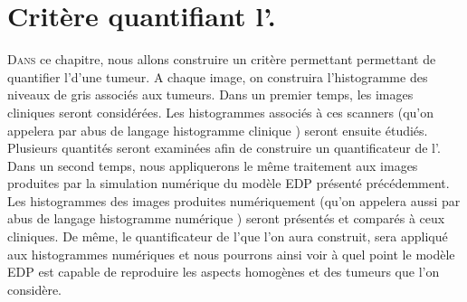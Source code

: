 \documentclass[main.tex]{subfiles}
\begin{document}



\chapter{Critère quantifiant l'\hetero.}
\lettrine[lines=2, lhang=0.33, loversize=0.25]{D}{ans} ce chapitre, nous allons construire un critère permettant permettant de quantifier l'\hetero d'une tumeur.
A chaque image, on construira l'histogramme des niveaux de gris associés aux tumeurs. 
Dans un premier temps, les images cliniques seront considérées. Les histogrammes associés à ces scanners (qu'on appelera par abus de langage \og histogramme clinique \fg) seront ensuite étudiés. Plusieurs quantités seront examinées afin de construire un quantificateur de l'\hetero.
Dans un second temps, nous appliquerons le même traitement aux images produites par la simulation numérique du modèle EDP présenté précédemment. Les histogrammes des images produites numériquement (qu'on appelera aussi par abus de langage \og histogramme numérique \fg) seront présentés et comparés à ceux cliniques. De même, le quantificateur de l'\hetero que l'on aura construit, sera appliqué aux histogrammes numériques et nous pourrons ainsi voir à quel point le modèle EDP est capable de reproduire les aspects homogènes et \heterogenes des tumeurs que l'on considère.
\end{document}
